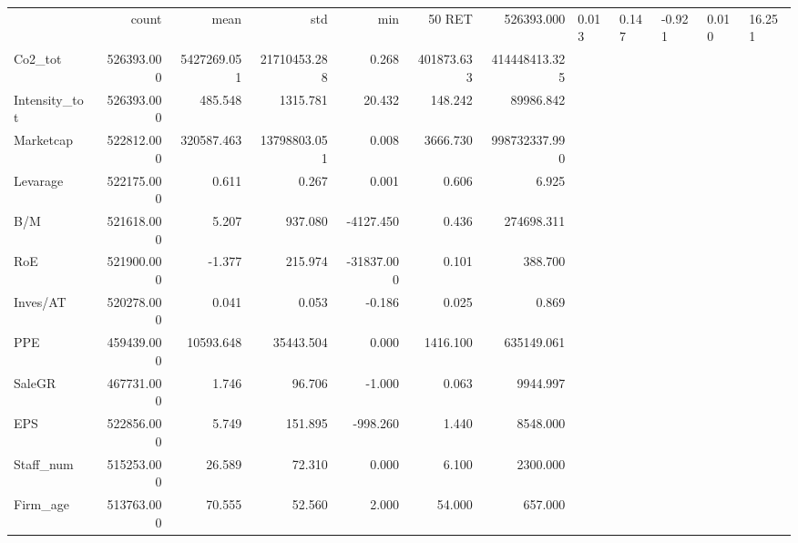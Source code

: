 \begin{tabular}{lrrrrrr}
\toprule
 & count & mean & std & min & 50%
\midrule
RET & 526393.000 & 0.013 & 0.147 & -0.921 & 0.010 & 16.251 \\
Co2_tot & 526393.000 & 5427269.051 & 21710453.288 & 0.268 & 401873.633 & 414448413.325 \\
Intensity_tot & 526393.000 & 485.548 & 1315.781 & 20.432 & 148.242 & 89986.842 \\
Marketcap & 522812.000 & 320587.463 & 13798803.051 & 0.008 & 3666.730 & 998732337.990 \\
Levarage & 522175.000 & 0.611 & 0.267 & 0.001 & 0.606 & 6.925 \\
B/M & 521618.000 & 5.207 & 937.080 & -4127.450 & 0.436 & 274698.311 \\
RoE & 521900.000 & -1.377 & 215.974 & -31837.000 & 0.101 & 388.700 \\
Inves/AT & 520278.000 & 0.041 & 0.053 & -0.186 & 0.025 & 0.869 \\
PPE & 459439.000 & 10593.648 & 35443.504 & 0.000 & 1416.100 & 635149.061 \\
SaleGR & 467731.000 & 1.746 & 96.706 & -1.000 & 0.063 & 9944.997 \\
EPS & 522856.000 & 5.749 & 151.895 & -998.260 & 1.440 & 8548.000 \\
Staff_num & 515253.000 & 26.589 & 72.310 & 0.000 & 6.100 & 2300.000 \\
Firm_age & 513763.000 & 70.555 & 52.560 & 2.000 & 54.000 & 657.000 \\
\bottomrule
\end{tabular}
